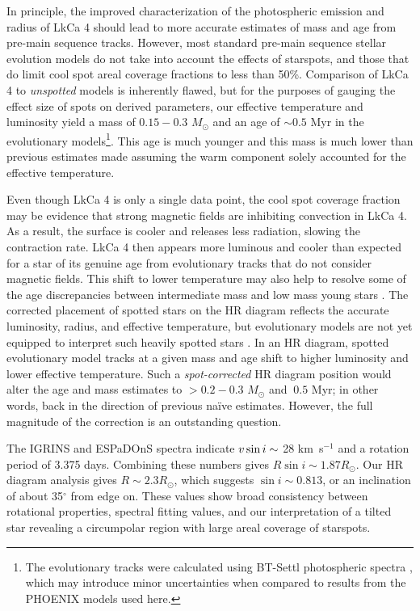 \documentclass[twocolumn]{emulateapj}%
\begin{document}
In principle, the improved characterization of the photospheric emission and radius of LkCa 4 should lead to more accurate estimates of mass and age from pre-main sequence tracks.  However, most standard pre-main sequence stellar evolution models do not take into account the effects of starspots, and those that do \citep{somers15} limit cool spot areal coverage fractions to less than 50\%.  Comparison of LkCa 4 to \emph{unspotted} models is inherently flawed, but for the purposes of gauging the effect size of spots on derived parameters, our effective temperature and luminosity yield a mass of $0.15-0.3$ $M_\odot$ and an age of $\sim 0.5$ Myr in the \citet{baraffe15} evolutionary models\footnote{The \citet{baraffe15} evolutionary tracks were calculated using BT-Settl photospheric spectra \citep{allard14}, which may introduce minor uncertainties when compared to results from the PHOENIX models used here.}.  This age is much younger and this mass is much lower than previous estimates made assuming the warm component solely accounted for the effective temperature.

Even though LkCa 4 is only a single data point, the cool spot coverage fraction may be evidence that strong magnetic fields are inhibiting convection in LkCa 4.  As a result, the surface is cooler and releases less radiation, slowing the contraction rate.  LkCa 4 then appears more luminous and cooler than expected for a star of its genuine age from evolutionary tracks that do not consider magnetic fields.   This shift to lower temperature may also help to resolve some of the age discrepancies between intermediate mass and low mass young stars \citep[e.g.][]{herczeg15}.  The corrected placement of spotted stars on the HR diagram reflects the accurate luminosity, radius, and effective temperature, but evolutionary models are not yet equipped to interpret such heavily spotted stars \citep{somers15}.  In an HR diagram, spotted evolutionary model tracks at a given mass and age shift to higher luminosity and lower effective temperature.  Such a \emph{spot-corrected} HR diagram position would alter the age and mass estimates to $> 0.2-0.3$ $M_\odot$ and $\> 0.5$ Myr; in other words, back in the direction of previous na\"{i}ve estimates.  However, the full magnitude of the correction is an outstanding question.

The IGRINS and ESPaDOnS spectra indicate $v \sin i\sim$ 28 km~s$^{-1}$ and a rotation period of 3.375 days. Combining these numbers gives $R\sin{i} \sim 1.87 R_{\odot}$. Our HR diagram analysis gives $R \sim 2.3R_{\odot}$, which suggests  $\sin{i} \sim 0.813$, or an inclination of about 35$^{\circ}$ from edge on. These values show broad consistency between rotational properties, spectral fitting values, and our interpretation of a tilted star revealing a circumpolar region with large areal coverage of starspots.
\end{document}
